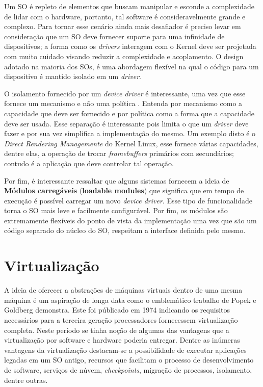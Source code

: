 Um SO é repleto de elementos que buscam manipular e esconde a complexidade de
lidar com o hardware, portanto, tal software é consideravelmente grande e
complexo. Para tornar esse cenário ainda mais desafiador é preciso levar em
consideração que um SO deve fornecer suporte para uma infinidade de
dispositivos; a forma como os \emph{drivers} interagem com o Kernel deve ser
projetada com muito cuidado visando reduzir a complexidade e acoplamento.  O
design adotado na maioria dos SOs, é uma abordagem flexível na qual o código
para um dispositivo é mantido isolado em um \emph{driver}.

O isolamento fornecido por um \emph{device driver} é interessante, uma vez que
esse fornece um mecanismo e não uma política \cite{ddbook}. Entenda por
mecanismo como a capacidade que deve ser fornecido e por política como a forma
que a capacidade deve ser usada. Esse separação é interessante pois limita o
que um \emph{driver} deve fazer e por sua vez simplifica a implementação do
mesmo. Um exemplo disto é o \emph{Direct Rendering Managemente} do Kernel
Linux, esse fornece várias capacidades, dentre elas, a operação de trocar
\emph{framebuffers} primários com secundários; contudo é a aplicação que deve
controlar tal operação.

Por fim, é interessante ressaltar que alguns sistemas fornecem a ideia de
\textbf{Módulos carregáveis} (\textbf{loadable modules}) que significa que em
tempo de execução é possível carregar um novo \emph{device driver}. Esse tipo
de funcionalidade torna o SO mais leve e facilmente configurável. Por fim, os
módulos são extremamente flexíveis do ponto de vista da implementação uma vez
que são um código separado do núcleo do SO, respeitam a interface definida pelo
mesmo.

\section{Virtualização}
\label{sec:virtualizacao}


A ideia de oferecer a abstrações de máquinas virtuais dentro de uma mesma
máquina é um aspiração de longa data como o emblemático trabalho de Popek e
Goldberg \cite{popek} demonstra. Este foi públicado em 1974 indicando os
requisitos necessários para a terceira geração processadores fornecessem
virtualização completa. Neste período se tinha noção de algumas das vantagens
que a virtualização por software e hardware poderia entregar. Dentre as
inúmeras vantagens da virtualização destacam-se a possibilidade de executar
aplicações legadas em um SO antigo, recursos que facilitam o processo de
desenvolvimento de software, serviços de núvem, \emph{checkpoints}, migração de
processos, isolamento, dentre outras.

